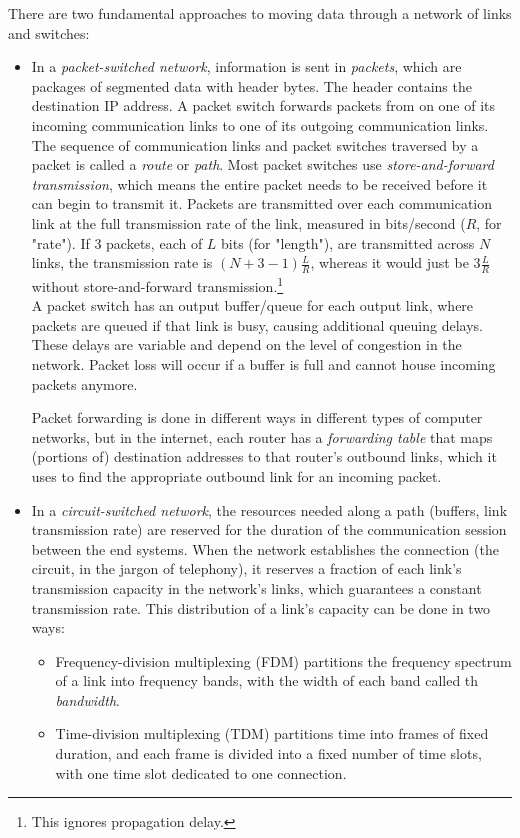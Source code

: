 \documentclass[table, xcdraw]{article}%
\begin{document}
There are two fundamental approaches to moving data through a network of links and switches:
\begin{itemize}
    \item In a \emph{packet-switched network}, information is sent in \emph{packets}, which are packages of segmented data with header bytes. The header contains the destination IP address. A packet switch forwards packets from on one of its incoming communication links to one of its outgoing communication links. The sequence of communication links and packet switches traversed by a packet is called a \emph{route} or \emph{path}. Most packet switches use \emph{store-and-forward transmission}, which means the entire packet needs to be received before it can begin to transmit it. Packets are transmitted over each communication link at the full transmission rate of the link, measured in bits/second ($R$, for "rate"). If 3 packets, each of $L$ bits (for "length"), are transmitted across $N$ links, the transmission rate is $(N + 3-1) \frac{L}{R}$, whereas it would just be $3 \frac{L}{R}$ without store-and-forward transmission.\footnote{This ignores propagation delay.}\\
A packet switch has an output buffer/queue for each output link, where packets are queued if that link is busy, causing additional queuing delays. These delays are variable and depend on the level of congestion in the network. Packet loss will occur if a buffer is full and cannot house incoming packets anymore.

Packet forwarding is done in different ways in different types of computer networks, but in the internet, each router has a \emph{forwarding table} that maps (portions of) destination addresses to that router's outbound links, which it uses to find the appropriate outbound link for an incoming packet.
\item In a \emph{circuit-switched network}, the resources needed along a path (buffers, link transmission rate) are reserved for the duration of the communication session between the end systems. When the network establishes the connection (the circuit, in the jargon of telephony), it reserves a fraction of each link’s transmission capacity in the network’s links, which guarantees a constant transmission rate. This distribution of a link's capacity can be done in two ways:

\begin{itemize}
    \item Frequency-division multiplexing (FDM) partitions the frequency spectrum of a link into frequency bands, with the width of each band called th \emph{bandwidth}.
    \item Time-division multiplexing (TDM) partitions time into frames of fixed duration, and each frame is
divided into a fixed number of time slots, with one time slot dedicated to one connection.
\end{itemize}

\end{itemize}
\end{document}
